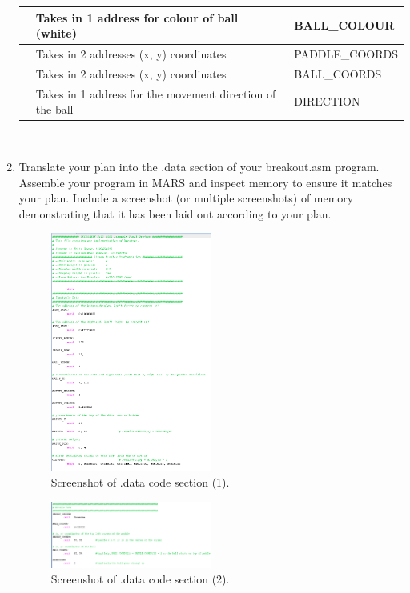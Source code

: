 \documentclass{article}
\begin{document}
\begin{enumerate}
\begin{table}[]
\begin{tabular}{|l|l|l|}
                 & Takes in 1 address for colour of ball (white)                                  & BALL\_COLOUR   \\ \hline
                 & Takes in 2 addresses (x, y) coordinates                           & PADDLE\_COORDS \\ \hline
                 & Takes in 2 addresses (x, y) coordinates                           & BALL\_COORDS   \\ \hline
                 & Takes in 1 address for the movement direction of the ball         & DIRECTION      \\ \hline
\end{tabular}
\end{table}

\\

\newpage
\item Translate your plan into the .data section of your breakout.asm program. Assemble your program in MARS and inspect memory to ensure it matches your plan. Include a screenshot (or multiple screenshots) of memory demonstrating that it has been laid out according to your plan.

\begin{figure}[ht!]
    \centering
    \includegraphics[width=0.5\textwidth]{memory2.png}
    \caption{Screenshot of .data code section (1).}
    \label{f:part1_memory1}
\end{figure}

\begin{figure}[ht!]
    \centering
    \includegraphics[width=0.5\textwidth]{memory3.png}
    \caption{Screenshot of .data code section (2).}
    \label{f:part1_memory2}
\end{figure}


\end{enumerate}
\end{document}
